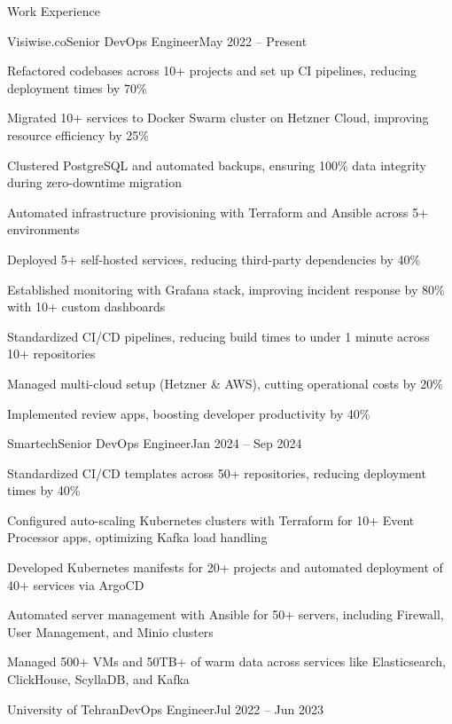 \documentclass[]{main}
\begin{document}
\newpage

\begin{section}{Work Experience}
 \begin{subsection}{Visiwise.co}{Senior DevOps Engineer}{May 2022 -- Present}{}
     \item Refactored codebases across 10+ projects and set up CI pipelines, reducing deployment times by 70\%
     \item Migrated 10+ services to Docker Swarm cluster on Hetzner Cloud, improving resource efficiency by 25\%
     \item Clustered PostgreSQL and automated backups, ensuring 100\% data integrity during zero-downtime migration
     \item Automated infrastructure provisioning with Terraform and Ansible across 5+ environments
     \item Deployed 5+ self-hosted services, reducing third-party dependencies by 40\%
     \item Established monitoring with Grafana stack, improving incident response by 80\% with 10+ custom dashboards
     \item Standardized CI/CD pipelines, reducing build times to under 1 minute across 10+ repositories
     \item Managed multi-cloud setup (Hetzner \& AWS), cutting operational costs by 20\%
     \item Implemented review apps, boosting developer productivity by 40\%
 \end{subsection}
 \begin{subsection}{Smartech}{Senior DevOps Engineer}{Jan 2024 -- Sep 2024}{}
     \item Standardized CI/CD templates across 50+ repositories, reducing deployment times by 40\%
     \item Configured auto-scaling Kubernetes clusters with Terraform for 10+ Event Processor apps, optimizing Kafka load handling
     \item Developed Kubernetes manifests for 20+ projects and automated deployment of 40+ services via ArgoCD
     \item Automated server management with Ansible for 50+ servers, including Firewall, User Management, and Minio clusters
     \item Managed 500+ VMs and 50TB+ of warm data across services like Elasticsearch, ClickHouse, ScyllaDB, and Kafka
 \end{subsection}
 \begin{subsection}{University of Tehran}{DevOps Engineer}{Jul 2022 -- Jun 2023}{}

\end{subsection}
\end{section}
\end{document}
